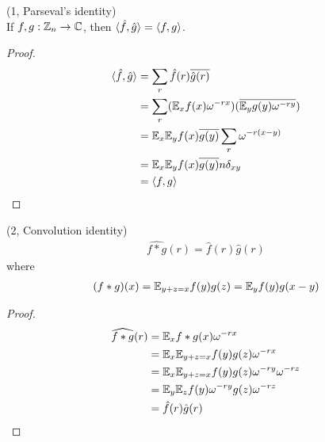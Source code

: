 \documentclass[a4paper]{article}
\begin{document}
\begin{lemma} (1, Parseval's identity)\\
    If $f,g: \mathbb{Z}_n \to \mathbb{C}$, then $\langle \hat{f},\hat{g}\rangle = \langle f,g\rangle$.
    \begin{proof}
        \begin{equation*}
            \begin{aligned}
                \langle\hat{f},\hat{g}\rangle &= \sum_r \hat{f}(r) \overline{\hat{g}(r)}\\
                &= \sum_r (\mathbb{E}_x f(x) \omega^{-rx}) (\overline{\mathbb{E}_y g(y) \omega^{-ry}})\\
                &= \mathbb{E}_x \mathbb{E}_y f(x) \overline{g(y)} \sum_r \omega^{-r(x-y)}\\
                &= \mathbb{E}_x \mathbb{E}_y f(x) \overline{g(y)} n\delta_{xy}\\
                &= \langle f,g\rangle
            \end{aligned}
            \end{equation*}
    \end{proof}
\end{lemma}

\begin{lemma} (2, Convolution identity)\\
    \begin{equation*}
        \begin{aligned}
            \widehat{f*g}(r) = \hat{f}(r)\hat{g}(r)
        \end{aligned}
    \end{equation*}
    where
    \begin{equation*}
        \begin{aligned}
            (f*g)(x) = \mathbb{E}_{y+z=x}f(y)g(z) = \mathbb{E}_y f(y)g(x-y)
        \end{aligned}
    \end{equation*}
    \begin{proof}
        \begin{equation*}
            \begin{aligned}
                \widehat{f*g}(r) &= \mathbb{E}_x f*g(x)\omega^{-rx}\\
                &=\mathbb{E}_x \mathbb{E}_{y+z=x}f(y)g(z)\omega^{-rx}\\
                &=\mathbb{E}_x\mathbb{E}_{y+z=x} f(y)g(z) \omega^{-ry}\omega^{-rz}\\
                &=\mathbb{E}_y\mathbb{E}_z f(y) \omega^{-ry} g(z) \omega^{-rz}\\
                &=\hat{f}(r) \hat{g}(r)
            \end{aligned}
        \end{equation*}
    \end{proof}

\end{lemma}
\end{document}
